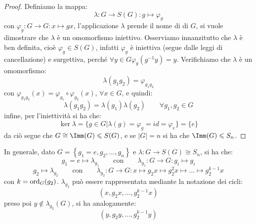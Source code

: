 \documentclass[11pt]{scrartcl}
\begin{document}
\begin{proof}
    Definiamo la mappa:
        \[ \lambda : G \longrightarrow S(G) : g \longmapsto \varphi_g
            \]
    con $\varphi_g : G \longrightarrow G : x \longmapsto gx$, l'applicazione $\lambda$ prende il nome di  di $G$, si 
    vuole dimostrare che $\lambda$ è un omomorfismo iniettivo.
    Osserviamo innanzitutto che $\lambda$ è ben definita, cioè $\varphi_g \in S(G)$, infatti $\varphi_g$ è iniettiva (segue dalle leggi di cancellazione) e 
    surgettiva, perché $\forall y \in G \varphi_g(g^{-1}y) = y$. Verifichiamo che $\lambda$ è un omomorfismo:
        \[ \lambda(g_1g_2) = \varphi_{g_1g_2}
            \]
    con $\varphi_{g_1g_2} (x) = \varphi_{g_1} \circ \varphi_{g_2} (x)$, $\forall x \in G$, e quindi:
        \[ \lambda(g_1g_2) = \lambda(g_1) \lambda(g_2)
        \qquad \forall g_1,g_2 \in G
            \]
    infine, per l'iniettività si ha che:
        \[ \ker \lambda = \{g \in G | \lambda(g) = \varphi_g = id = \varphi_e\} = \{e\}
            \]
    da ciò segue che $G \cong \Imm(G) \leqslant S(G)$, e se $|G| = n$ si ha che $\Imm(G) \leqslant S_n$.
\end{proof}

\begin{remark}
    In generale, dato $G = \left\{g_1 = e,g_2, \ldots, g_n\right\}$ e $\lambda : G \longrightarrow S(G) \cong S_n$, si ha che:
        \[ g_1 = e \longmapsto \lambda_{g_1} \qquad \text{con} \qquad \lambda_{g_1}: G \longrightarrow G : g_i \longmapsto g_i
            \]
        \[ g_2 \longmapsto \lambda_{g_2} \qquad \text{con} \qquad \lambda_{g_2} : G \longrightarrow G : x \longmapsto g_2x \longmapsto g_2^2x \longmapsto \ldots \longmapsto g_2^{k-1}x
            \]
        con $k = \operatorname{ord}_G(g_2)$. $\lambda_{g_2}$ può essere rappresentata mediante la notazione dei cicli:
            \[ (x,g_2x,\ldots,g_2^{k-1}x)
                \]
        preso poi $y \not\in \lambda_{g_2}(G)$, si ha analogamente:
        \[ (y,g_2y,\ldots,g_2^{k-1}y)
            \]
\end{remark}
\end{document}
